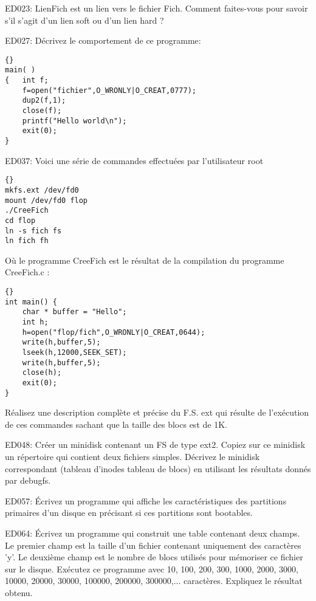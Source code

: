 \begin{list}{+}{}
\item ED023: 
LienFich est un lien vers le fichier Fich. Comment faites-vous pour savoir s'il s'agit d'un lien soft ou d'un lien hard ?


\item ED027: 
Décrivez le comportement de ce programme:
\begin{lstlisting}[frame=trBL]{}
main( )
{	int f;
	f=open("fichier",O_WRONLY|O_CREAT,0777);
	dup2(f,1);
	close(f);
	printf("Hello world\n");
	exit(0);
}
\end{lstlisting}


\item ED037: 
Voici une série de commandes effectuées par l'utilisateur root
\lstset{language=bash,frame=trBL}
\begin{lstlisting}[frame=trBL]{}
mkfs.ext /dev/fd0
mount /dev/fd0 flop
./CreeFich
cd flop
ln -s fich fs
ln fich fh
\end{lstlisting}

Où le programme CreeFich est le résultat de la compilation du programme CreeFich.c :

\lstset{language=c,frame=trBL}
\begin{lstlisting}[frame=trBL]{}
int main() {
	char * buffer = "Hello";
	int h;
	h=open("flop/fich",O_WRONLY|O_CREAT,0644);
	write(h,buffer,5);
	lseek(h,12000,SEEK_SET);
	write(h,buffer,5);
	close(h);
	exit(0);
}
\end{lstlisting}

Réalisez une description complète et précise du F.S. ext qui résulte de l'exécution de ces commandes sachant que la taille des blocs est de 1K.


\item ED048: 
Créer un minidisk contenant un FS de type ext2. Copiez sur ce minidisk un répertoire qui contient deux fichiers simples. Décrivez le minidisk correspondant (tableau d'inodes tableau de blocs) en utilisant les résultats donnés par debugfs.  


\item ED057:
Écrivez un programme qui affiche les caractéristiques des partitions primaires d'un disque en précisant si ces partitions sont bootables.  


\item ED064: 
Écrivez un programme qui construit une table contenant deux champs. Le premier champ est la taille d'un fichier contenant uniquement des caractères 'y'. Le deuxième champ est le nombre de blocs utilisés pour mémoriser ce fichier sur le disque. Exécutez ce programme avec 10, 100, 200, 300, 1000, 2000, 3000, 10000, 20000, 30000, 100000, 200000, 300000,... caractères. Expliquez le résultat obtenu. 
 


\end{list}
